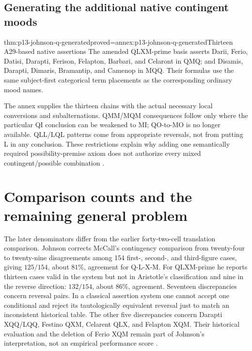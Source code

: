 \subsection{Generating the additional native contingent moods}
\label{sec:p13-johnson-q-generation}

\begin{hbtheorem}{thm:p13-johnson-q-generated}{proved=annex:p13-johnson-q-generated}{Thirteen A29-based native assertions}
The amended QLXM-prime basis asserts Darii, Ferio, Datisi, Darapti, Ferison,
Felapton, Barbari, and Celaront in QMQ; and Disamis, Darapti, Dimaris,
Bramantip, and Camenop in MQQ. Their formulas use the same subject-first
categorical term placements as the corresponding ordinary mood names.
\end{hbtheorem}

The annex supplies the thirteen chains with the actual necessary local
conversions and subalternations. QMM/MQM consequences follow only where
the particular QI conclusion can be weakened to MI; QO-to-MO is no longer
available. QLL/LQL patterns come from appropriate reversals, not from
putting L in any conclusion. These restrictions explain why adding one
semantically required possibility-premise axiom does not authorize every
mixed contingent/possible combination
\parencite[pp.~299--302]{Johnson2004ModalSyllogisms}.

\section{Comparison counts and the remaining general problem}
\label{sec:p13-johnson-mccall-limits}

The later denominators differ from the earlier forty-two-cell translation
comparison. Johnson corrects McCall's contingency comparison from twenty-four
to twenty-nine disagreements among 154 first-, second-, and third-figure
cases, giving \(125/154\), about \(81\%\), agreement for Q-L-X-M.
For QLXM-prime he reports thirteen cases valid in the system but not in
Aristotle's classification and nine in the reverse direction: \(132/154\),
about \(86\%\), agreement. Seventeen discrepancies concern reversal pairs.
In a classical assertion system one cannot accept one conditional and reject
its tautologically equivalent reversal just to match an inconsistent historical
table. The other five discrepancies concern Darapti XQQ/LQQ, Festino QXM,
Celarent QLX, and Felapton XQM. Their historical evaluation and the deletion
of Ferio XQM remain part of Johnson's interpretation, not an empirical
performance score \parencite[pp.~288, 303]{Johnson2004ModalSyllogisms}.

